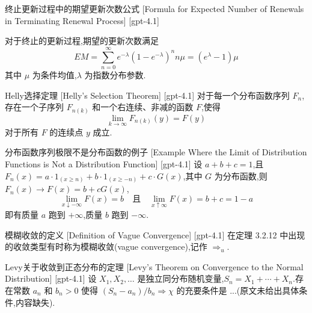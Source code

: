 \documentclass[UTF8]{ctexart}
\begin{document}
    
    
    \begin{thm}
        {终止更新过程中的期望更新次数公式}
        [Formula for Expected Number of Renewals in Terminating Renewal Process]
        [gpt-4.1]
        
对于终止的更新过程,期望的更新次数满足
\[
E M = \sum _ { n = 0 } ^ { \infty } e ^ { - \lambda } ( 1 - e ^ { - \lambda } ) ^ { n } n \mu = ( e ^ { \lambda } - 1 ) \mu
\]
其中 $\mu$ 为条件均值,$\lambda$ 为指数分布参数.

    \end{thm}
    
    
    
    \begin{thm}
        {Helly选择定理}
        [Helly's Selection Theorem]
        [gpt-4.1]
        对于每一个分布函数序列 $F_{n}$,存在一个子序列 $F_{n(k)}$ 和一个右连续、非减的函数 $F$,使得
\[
\lim_{k \to \infty} F_{n(k)} ( y ) = F ( y )
\]
对于所有 $F$ 的连续点 $y$ 成立.
    \end{thm}
    
    
    
    \begin{xmp}
        {分布函数序列极限不是分布函数的例子}
        [Example Where the Limit of Distribution Functions is Not a Distribution Function]
        [gpt-4.1]
        设 $a + b + c = 1$,且 $F_{n} ( x ) = a \cdot 1_{( x \geq n )} + b \cdot 1_{( x \geq - n )} + c \cdot G ( x )$,其中 $G$ 为分布函数,则 $F_{n} ( x ) \to F ( x ) = b + c G ( x )$,
\[
\lim_{x \downarrow -\infty} F ( x ) = b \quad \text{且} \quad \lim_{x \uparrow \infty} F ( x ) = b + c = 1 - a
\]
即有质量 $a$ 跑到 $+\infty$,质量 $b$ 跑到 $-\infty$.
    \end{xmp}
    
    
    
    \begin{dfn}
        {模糊收敛的定义}
        [Definition of Vague Convergence]
        [gpt-4.1]
        在定理 3.2.12 中出现的收敛类型有时称为模糊收敛(vague convergence),记作 $\Rightarrow_{
u}$.
    \end{dfn}
    
    
    
    \begin{thm}
        {Levy关于收敛到正态分布的定理}
        [Levy's Theorem on Convergence to the Normal Distribution]
        [gpt-4.1]
        设 $X_{1}, X_{2}, \dots$ 是独立同分布随机变量,$S_{n} = X_{1} + \cdots + X_{n}$.存在常数 $a_{n}$ 和 $b_{n} > 0$ 使得 $(S_{n} - a_{n}) / b_{n} \Rightarrow \chi$ 的充要条件是 ...(原文未给出具体条件,内容缺失).
    \end{thm}
    
\end{document}
